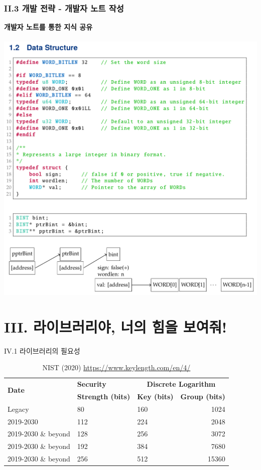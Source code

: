 \documentclass{beamer}
\begin{document}
\begin{frame}
	\frametitle{II.3 개발 전략 - 개발자 노트 작성}
		\alert{\bf 개발자 노트를 통한 지식 공유}\\
		\ \\
		\includegraphics[width=\linewidth,height=.825\textheight]{note1.png}
\end{frame}

\section{III. 라이브러리야, 너의 힘을 보여줘!}
\begin{frame}{IV.1 라이브러리의 필요성}
		\begin{table}[h!]
			\centering
			\begin{tabularx}{\textwidth}{l||X|Xr}
				\toprule
				\multirow{2}{*}{\bf Date}&\textbf{Security}&\multicolumn{2}{c}{\bf Discrete Logarithm}\\
				& \textbf{Strength (bits)}& \textbf{Key (bits)} & \textbf{Group (bits)} \\
				\midrule
				Legacy & 80 & 160 & 1024\\
				2019-2030 & 112 & 224 & 2048\\
				2019-2030 \& beyond & 128 & 256 & 3072\\
				2019-2030 \& beyond & 192 & 384 & 7680\\
				2019-2030 \& beyond & 256 & 512 & 15360\\
				\bottomrule
			\end{tabularx}
			\caption{NIST (2020) \url{https://www.keylength.com/en/4/}}
			\label{tab:c_data_types}
		\end{table}
\end{frame}
\end{document}
